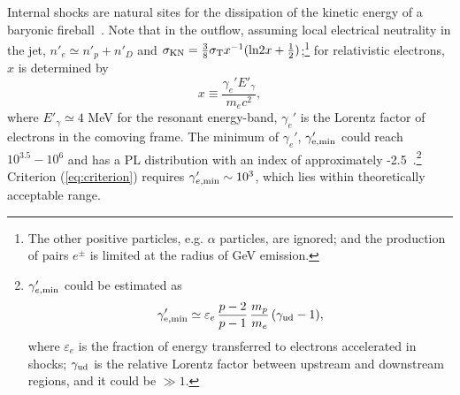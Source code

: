 \documentclass[linenumbers,twocolumn]{aastex631}
\begin{document}
Internal shocks are natural sites for the dissipation of the kinetic energy of a baryonic fireball~\citep[e.g.][]{1990ApJ...365L..55S,1992MNRAS.258P..41R,1993ApJ...405..278M,1994ApJ...430L..93R}. Note that in the outflow, assuming local electrical neutrality in the jet, $n'_{e}\simeq n'_p+n'_D$ and $\sigma_{\rm KN}=\frac{3}{8}\sigma_{\rm T}x^{-1}(\textmd {ln} 2x+ \frac{1}{2})$\citep{1986rpa..book.....R};\footnote{The other positive particles, e.g. $\alpha$ particles, are ignored; and the production of pairs $e^{\pm}$ is limited at the radius of GeV emission.} for relativistic electrons, $x$ is determined by
\begin{equation}
x \equiv \frac{\gamma_e' E'_{\gamma}}{m_e c^2},
\end{equation}
where $E'_{\gamma}\simeq 4$ MeV for the resonant energy-band, $\gamma_e'$ is the Lorentz factor of electrons in the comoving frame. The minimum of $\gamma_e'$, $\gamma_{\rm e, min}'$
could reach $10^{3.5}-10^6$ and has a PL distribution with an index of approximately -2.5~\citep[e.g.,][]{1995ApJ...455L.143S,1996ApJ...473..204S,2013ApJ...769...69B}.\footnote{$\gamma_{e,\rm min}'$  could be estimated as
\begin{equation}
\gamma_{\rm e,min}' \simeq 
\varepsilon_e\,\frac{p-2}{p-1}\,
\frac{m_p}{m_e}\,
(\gamma_{\rm ud}-1),
\end{equation}
where $\varepsilon_e$ is the fraction of energy transferred to electrons accelerated in shocks; $\gamma_{\rm ud}$ is the relative Lorentz factor between upstream and downstream regions, and it could be $\gg1$.
} Criterion (\ref{eq:criterion}) requires $\gamma_{e,\rm min}'\sim10^3$, which lies within theoretically acceptable range.
\end{document}
